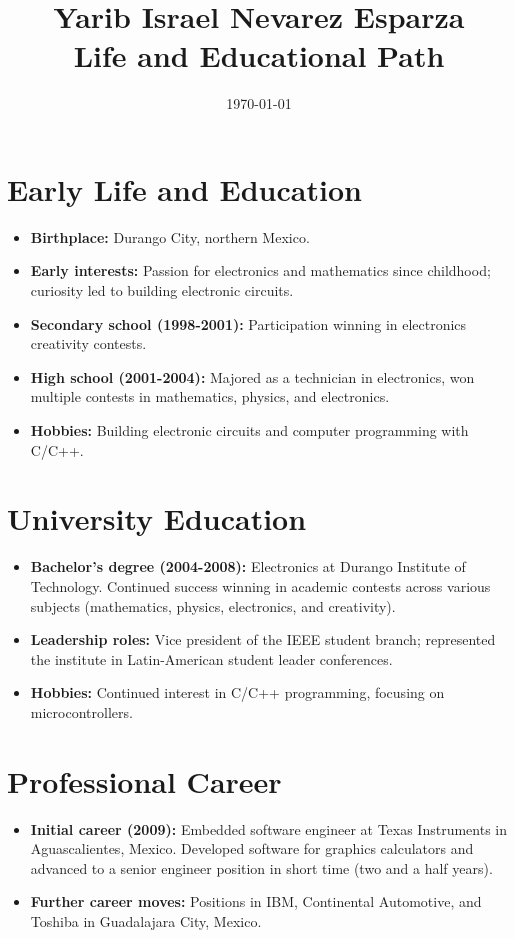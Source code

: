 \documentclass{article}
\title{Yarib Israel Nevarez Esparza \\ Life and Educational Path}
\author{}
\date{\today}
\begin{document}
	
	\maketitle
	\vspace{-10mm} %
	
	\section*{Early Life and Education}
	\begin{itemize}
    \item \textbf{Birthplace:} Durango City, northern Mexico.
    \item \textbf{Early interests:} Passion for electronics and mathematics since childhood; curiosity led to building electronic circuits.
    \item \textbf{Secondary school (1998-2001):} Participation winning in electronics creativity contests.
    \item \textbf{High school (2001-2004):} Majored as a technician in electronics, won multiple contests in mathematics, physics, and electronics.
    \item \textbf{Hobbies:} Building electronic circuits and computer programming with C/C++.
\end{itemize}

\section*{University Education}
\begin{itemize}[noitemsep]
    \item \textbf{Bachelor's degree (2004-2008):} Electronics at Durango Institute of Technology. Continued success winning in academic contests across various subjects (mathematics, physics, electronics, and creativity). 
    \item \textbf{Leadership roles:} Vice president of the IEEE student branch; represented the institute in Latin-American student leader conferences.
    \item \textbf{Hobbies:} Continued interest in C/C++ programming, focusing on microcontrollers.
\end{itemize}

\section*{Professional Career}
\begin{itemize}[noitemsep]
    \item \textbf{Initial career (2009):} Embedded software engineer at Texas Instruments in Aguascalientes, Mexico. Developed software for graphics calculators and advanced to a senior engineer position in short time (two and a half years).
    \item \textbf{Further career moves:} Positions in IBM, Continental Automotive, and Toshiba in Guadalajara City, Mexico.
\end{itemize}
\end{document}
